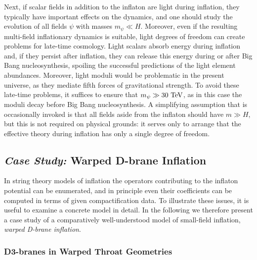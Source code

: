 \documentclass[12pt,letterpaper,rotate]{article}
\begin{document}
{Next, if scalar fields in addition to the inflaton are light during inflation, they typically have important effects on the dynamics, and one should study the evolution of all fields $\psi$ with masses $m_\psi \ll H$.  Moreover, even if the resulting multi-field inflationary dynamics is suitable, light degrees of freedom can create problems for late-time cosmology.  Light scalars absorb energy during inflation and, if they persist after inflation, they can release this energy during or after Big Bang nucleosynthesis, spoiling the successful predictions of the light element abundances.  Moreover, light moduli would be problematic in the present universe, as they mediate fifth forces of gravitational strength. To avoid these late-time problems, it suffices to  ensure that $m_\psi \gg 30 ~\rm{TeV}$, as in this case the moduli decay before Big Bang nucleosynthesis.  A simplifying assumption that is occasionally invoked is that all fields aside from the inflaton should have $m \gg H$, but this is not required on physical grounds: it serves only to arrange that the effective theory during inflation has only a single degree of freedom.



\subsection{{\sl Case Study:} Warped D-brane Inflation}
\label{sec:warped}

In string theory models of inflation the operators contributing to the inflaton potential can be enumerated, and in principle even their coefficients can be computed in terms of given compactification data.
To illustrate these issues, it is useful to examine a concrete model in detail.
In the following we therefore present a case study of a comparatively well-understood model of small-field inflation, {\it{warped D-brane inflation}}.

\subsubsection{D3-branes in Warped Throat Geometries}

}
\end{document}
